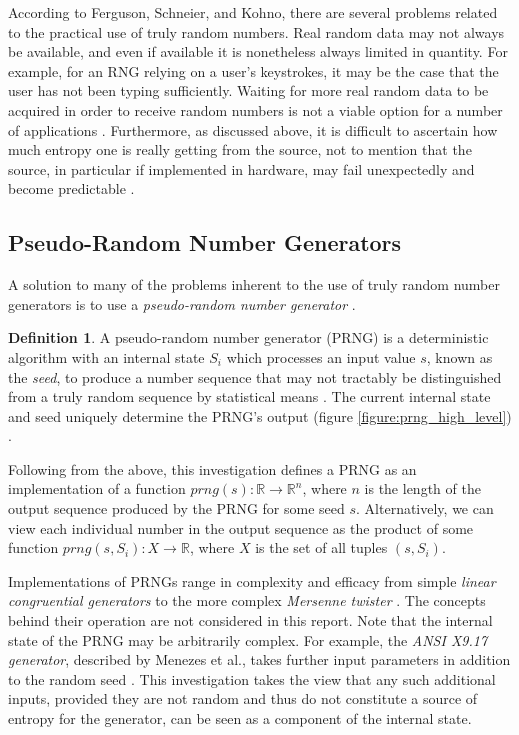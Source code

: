\documentclass[12pt, titlepage]{report}
\theoremstyle{definition}
\newtheorem{definition}{Definition}
\begin{document}
According to Ferguson, Schneier, and Kohno, there are several problems related to the practical use of truly random numbers. Real random data may not always be available, and even if available it is nonetheless always limited in quantity. For example, for an RNG relying on a user's keystrokes, it may be the case that the user has not been typing sufficiently. Waiting for more real random data to be acquired in order to receive random numbers is not a viable option for a number of applications \cite[p. 139]{ferguson2010cryptography}. Furthermore, as discussed above, it is difficult to ascertain how much entropy one is really getting from the source, not to mention that the source, in particular if implemented in hardware, may fail unexpectedly and become predictable \cite{ferguson2010cryptography}.



\subsection{Pseudo-Random Number Generators}\label{subsection:prngs}
A solution to many of the problems inherent to the use of truly random number generators is to use a \emph{pseudo-random number generator} \cite[p. 140]{ferguson2010cryptography}.

\begin{definition}
A pseudo-random number generator (PRNG) is a deterministic algorithm with an internal state $S_i$ \cite[p. 2]{kelsey1998cryptanalytic} which processes an input value $s$, known as the \emph{seed}, to produce a number sequence that may not tractably be distinguished from a truly random sequence by statistical means \cite[p. 170]{menezes1996handbook}. The current internal state and seed uniquely determine the PRNG's output (figure \ref{figure:prng_high_level}) \cite[p. 2]{kelsey1998cryptanalytic} \cite[s 1.1.4]{rukhin2001statistical}.

Following from the above, this investigation defines a PRNG as an implementation of a function $prng(s) : \mathbb{R} \rightarrow \mathbb{R}^n$, where $n$ is the length of the output sequence produced by the PRNG for some seed $s$. Alternatively, we can view each individual number in the output sequence as the product of some function $prng(s, S_i) : X \rightarrow \mathbb{R}$, where $X$ is the set of all tuples $(s, S_i)$.
\end{definition}

Implementations of PRNGs range in complexity and efficacy from simple \emph{linear congruential generators} \cite[p. 170]{menezes1996handbook} to the more complex \emph{Mersenne twister} \cite{matsumoto1998mersenne}. The concepts behind their operation are not considered in this report. Note that the internal state of the PRNG may be arbitrarily complex. For example, the \emph{ANSI X9.17 generator}, described by Menezes et al., takes further input parameters in addition to the random seed \cite[p. 173]{menezes1996handbook}. This investigation takes the view that any such additional inputs, provided they are not random and thus do not constitute a source of entropy for the generator, can be seen as a component of the internal state.
\end{document}
